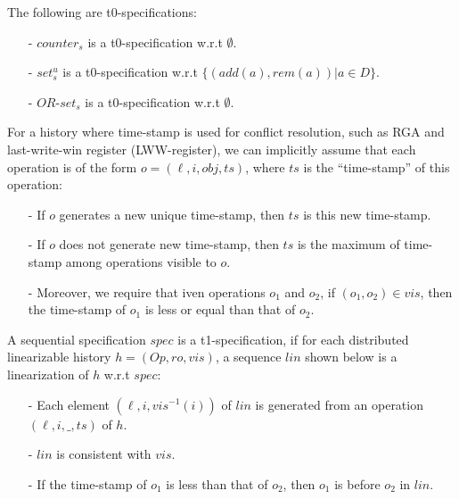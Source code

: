 \begin{lemma}
\label{lemma:several t0-specifications}
The following are t0-specifications:  

\begin{itemize}
\setlength{\itemsep}{0.5pt}
\item[-] $\mathit{counter}_s$ is a t0-specification w.r.t $\emptyset$. 

\item[-] $\mathit{set}_s^u$ is a t0-specification w.r.t $\{ (\mathit{add}(a),\mathit{rem}(a)) \vert a \in D \}$. 

\item[-] $\mathit{OR}$-$\mathit{set}_s$ is a t0-specification w.r.t $\emptyset$. 
\end{itemize}
\end{lemma} 

For a history where time-stamp is used for conflict resolution, such as RGA and last-write-win register (LWW-register), we can implicitly assume that each operation is of the form $o = (\ell,i,\mathit{obj},\mathit{ts})$, where $\mathit{ts}$ is the ``time-stamp'' of this operation: %

\begin{itemize}
\setlength{\itemsep}{0.5pt}
\item[-] If $o$ generates a new unique time-stamp, then $\mathit{ts}$ is this new time-stamp.  

\item[-] If $o$ does not generate new time-stamp, then $\mathit{ts}$ is the maximum of time-stamp among operations visible to $o$. 

\item[-] Moreover, we require that iven operations $o_1$ and $o_2$, if $(o_1,o_2) \in \mathit{vis}$, then the time-stamp of $o_1$ is less or equal than that of $o_2$.
\end{itemize} 


\begin{definition}[t1-specification]
\label{definition:t1-specification}
A sequential specification $\mathit{spec}$ is a t1-specification, if for each distributed linearizable history $h=(\mathit{Op},\mathit{ro},\mathit{vis})$, a sequence $\mathit{lin}$ shown below is a linearization of $h$ w.r.t $\mathit{spec}$:

\begin{itemize}
\setlength{\itemsep}{0.5pt}
\item[-] Each element $(\ell,i,\mathit{vis}^{-1}(i))$ of $\mathit{lin}$ is generated from an operation $(\ell,i,\_,\mathit{ts})$ of $h$. 

\item[-] $\mathit{lin}$ is consistent with $\mathit{vis}$. 

\item[-] If the time-stamp of $o_1$ is less than that of $o_2$, then $o_1$ is before $o_2$ in $\mathit{lin}$. 
\end{itemize}
\end{definition}



